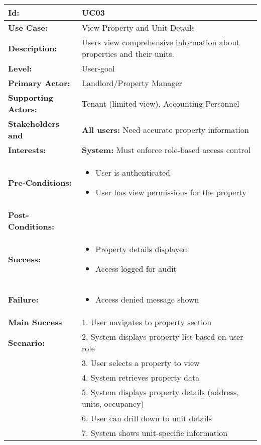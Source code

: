 \documentclass[12pt]{article}
\begin{document}
\begin{longtable}{|p{3cm}|p{11cm}|}
\hline
\textbf{Id:} & UC03 \\
\hline
\textbf{Use Case:} & View Property and Unit Details \\
\hline
\textbf{Description:} & Users view comprehensive information about properties and their units. \\
\hline
\textbf{Level:} & User-goal \\
\hline
\textbf{Primary Actor:} & Landlord/Property Manager \\
\hline
\textbf{Supporting Actors:} & Tenant (limited view), Accounting Personnel \\
\hline
\textbf{Stakeholders and} & \textbf{All users:} Need accurate property information \\
\textbf{Interests:} & \textbf{System:} Must enforce role-based access control \\
\hline
\textbf{Pre-Conditions:} & 
\begin{itemize}
    \item User is authenticated
    \item User has view permissions for the property
\end{itemize} \\
\hline
\textbf{Post-Conditions:} & \\
\textbf{Success:} & 
\begin{itemize}
    \item Property details displayed
    \item Access logged for audit
\end{itemize} \\
\textbf{Failure:} & 
\begin{itemize}
    \item Access denied message shown
\end{itemize} \\
\hline
\textbf{Main Success} & 1. User navigates to property section \\
\textbf{Scenario:} & 2. System displays property list based on user role \\
& 3. User selects a property to view \\
& 4. System retrieves property data \\
& 5. System displays property details (address, units, occupancy) \\
& 6. User can drill down to unit details \\
& 7. System shows unit-specific information \\

\end{longtable}
\end{document}
